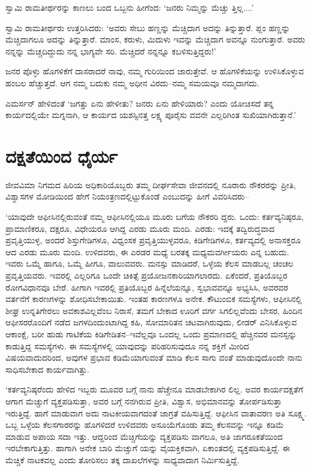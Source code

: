 ಸ್ವಾಮಿ ರಾಮತೀರ್ಥರನ್ನು ಕಾಣಲು ಬಂದ ಒಬ್ಬನು ಹೀಗೆಂದ: ‘ಜನರು ನಿಮ್ಮನ್ನು ಮೆಚ್ಚು ತ್ತಿಲ್ಲ....’

ಸ್ವಾಮಿ ರಾಮತೀರ್ಥರು ಉತ್ತರಿಸಿದರು: ‘ಅವರು ಸೇಬು ಹಣ್ಣನ್ನು ಮೆಚ್ಚಿದಾಗ ಅದನ್ನು ತಿನ್ನುತ್ತಾರೆ. ಪ್ಲಂ ಹಣ್ಣನ್ನು ಮೆಚ್ಚಿದಾಗಲೂ ಅದನ್ನು ತಿನ್ನುತ್ತಾರೆ. ಮಾಂಸ, ಕರುಳು, ಮಿದುಳು ಇವನ್ನು ಮೆಚ್ಚಿದಾಗ ಅವನ್ನೂ ನುಂಗುತ್ತಾರೆ. ಅವರು ನನ್ನನ್ನು ಮೆಚ್ಚದಿದ್ದುದು ನನ್ನ ಭಾಗ್ಯವೇ ಸರಿ. ಮೆಚ್ಚಿದರೆ ನನ್ನನ್ನೂ ಕಬಳಿಸುತ್ತಿದ್ದರು!’

ಜನರ ಪೊಳ್ಳು ಹೊಗಳಿಕೆಗೆ ದಾಸರಾದರೆ ನಾವು, ನಮ್ಮ ಗುರಿಯಿಂದ ಜಾರುತ್ತೇವೆ. ಆ ಹೊಗಳಿಕೆಯನ್ನು ಉಳಿಸಿಕೊಳ್ಳುವ ಹಂಬಲ ಹೆಚ್ಚುತ್ತದೆ. ಆಗ ನಮ್ಮ ಬದುಕು ನಮ್ಮ ಅಧೀನ ವಿರದು–ನಮ್ಮ ಸಮಯವೂ ನಮ್ಮದಾಗದು.

ಎಮರ್ಸನ್ ಹೇಳಿದಂತೆ ‘ಜಗತ್ತು ಏನು ಹೇಳೀತು? ಜನರು ಏನು ಹೇಳಿಯಾರು? ಎಂದು ಯೋಚಿಸದೆ ತನ್ನ ಕಾರ್ಯದಲ್ಲಿಯೇ ಮಗ್ನನಾಗಿ, ಆ ಕಾರ್ಯದ ಯಶಸ್ಸಿನತ್ತ ಲಕ್ಷ್ಯ ಪೂರೈಸು ವವನೇ ಎಲ್ಲರಿಗಿಂತ ಸುಖಿಯಾಗಿರುತ್ತಾನೆ.’


\section{ದಕ್ಷತೆಯಿಂದ ಧೈರ್ಯ}

ಜೀವವಿಮಾ ನಿಗಮದ ಹಿರಿಯ ಅಧಿಕಾರಿಯೊಬ್ಬರು ತಮ್ಮ ದೀರ್ಘಸೇವಾ ಜೀವನದಲ್ಲಿ ನೂರಾರು ನೌಕರರನ್ನು ಪ್ರೀತಿ, ವಿಶ್ವಾಸಗಳ ಮೋಡಿಯಿಂದ ಹೇಗೆ ನಿಯಂತ್ರಣದಲ್ಲಿಟ್ಟುಕೊಂಡೆ ಎಂಬುದನ್ನು ಹೀಗೆ ವಿವರಿಸಿದರು–

‘ಯಾವುದೇ ಆಫೀಸಿನಲ್ಲಿರುವಂತೆ ನಮ್ಮ ಆಫೀಸಿನಲ್ಲಿಯೂ ಮೂರು ಬಗೆಯ ನೌಕರರಿ ದ್ದರು. ಒಂದು: ಕರ್ತವ್ಯನಿಷ್ಠರೂ, ಪ್ರಾಮಾಣಿಕರೂ, ದಕ್ಷರೂ, ವಿಧೇಯರೂ ಆಗಿದ್ದ ಎರಡು ಮೂರು ಮಂದಿ. ಎರಡು: ಇದಕ್ಕೆ ತದ್ವಿರುದ್ಧವಾದ ಪ್ರವೃತ್ತಿಯುಳ್ಳ, ಅಂದರೆ ಶಿಸ್ತುಗೇಡಿಗಳೂ, ವಿಧ್ವಂಸಕ ಪ್ರವೃತ್ತಿಯುಳ್ಳವರೂ, ಕಿಡಿಗೇಡಿಗಳೂ, ಕರ್ತವ್ಯದಲ್ಲಿ ಅನಾಸಕ್ತರೂ ಆದ ಎರಡು ಮೂರು ಮಂದಿ. ಉಳಿದವರು, ಈ ಎರಡರ ಮಧ್ಯೆ ಬರತಕ್ಕ ಮಧ್ಯಮವರ್ಗೀಯರು ಎನ್ನ ಬಹುದು. ಇವರು ಒಮ್ಮೆ ಹಾಗೂ, ಒಮ್ಮೆ ಹೀಗೂ, ವಾಲುವವರು. ಮನಸ್ಸು ಮಾಡಿದರೆ, ಒಳ್ಳೆಯ ಕೆಲಸ ಮಾಡಬಲ್ಲ ಚಂಚಲ ಪ್ರವೃತ್ತಿಯವರು. ಇವರಲ್ಲಿ ಎಲ್ಲರಿಗೂ ಒಂದೇ ಚಿಕಿತ್ಸೆ ಪ್ರಯೋಜನಕಾರಿಯಾಗಲಾರದು. ಏಕೆಂದರೆ, ಪ್ರತಿಯೊಬ್ಬರ ರೋಗವಿಧಾನವೂ ಬೇರೆ. ಹೀಗಾಗಿ ಇವರಲ್ಲಿ ಪ್ರತಿಯೊಬ್ಬರ ಹಿನ್ನೆಲೆಯನ್ನೂ, ಸ್ವಭಾವವನ್ನೂ ಅಭ್ಯಸಿಸಿ, ಅವರವರ ವರ್ತನೆಗೆ ಕಾರಣಗಳನ್ನು ಶೋಧಿಸಬೇಕಾಯಿತು. ಇಂತಹ ಕಾರಣಗಳೂ ಅನೇಕ. ಕೌಟುಂಬಿಕ ಸಮಸ್ಯೆಗಳು, ಆಫೀಸಿನಲ್ಲಿ ಶೀಘ್ರ ಉನ್ನತಿಗೇರಲು ಅವಕಾಶವಿಲ್ಲವೆಂಬ ನಿರಾಸೆ, ತಮಗೆ ಬೇಕಾದ ಊರಿಗೆ ವರ್ಗ ಸಿಗಲಿಲ್ಲವೆಂದು ಬೇಸರ, ಹಿಂದಿನ ಆಫೀಸರರೊಂದಿಗೆ ನಡೆದ ಜಗಳದಿಂದುಂಟಾಗಿದ್ದ ಕಹಿ, ಸೋಮಾರಿತನ ಚಟವಾಗಿರುವುದು, ಲೀಡರ್ ಎನಿಸಿಕೊಳ್ಳುವ ಆಕಾಂಕ್ಷೆ, ಬರೀ ಹುಡು ಗಾಟಿಕೆಯ ಕಿಡಿಗೇಡಿತನ–ಇವೆಲ್ಲವೂ ಒಂದಲ್ಲ ಒಂದು ಪ್ರಮಾಣದಲ್ಲಿ ಹೆಚ್ಚಿನವರ ಮನಸ್ಸನ್ನು ಕಾಡುತ್ತಿದ್ದ ಸಮಸ್ಯೆಗಳು. ಈ ಸಮಸ್ಯೆಗಳಲ್ಲಿ ಯಾವುದನ್ನು ಪರಿಹರಿಸುವುದೂ ನನ್ನ ಶಕ್ತಿಗೆ ಮೀರಿದ ವಿಷಯವಾದುದರಿಂದ, ಅವುಗಳ ಪ್ರಭಾವ ಕಡಿಮೆಯಾಗುವಂತೆ ಮಾಡಿ ಕೆಲಸ ಸಾಗು ವಂತೆ ಮಾಡುವುದೊಂದೇ ನಾನು ಸಾಧಿಸಬೇಕಾದ ಕಾರ್ಯವಾಗಿತ್ತು.

‘ಕರ್ತವ್ಯನಿಷ್ಠರೆಂದು ಹೇಳಿದ ಇಬ್ಬರು ಮೂವರ ಬಗ್ಗೆ ನಾನು ಹೆಚ್ಚೇನೂ ಮಾಡಬೇಕಾಗಿರ ಲಿಲ್ಲ. ಅವರ ಕಾರ್ಯದಕ್ಷತೆಗೆ ಆಗಾಗ ಮೆಚ್ಚುಗೆ ವ್ಯಕ್ತಪಡಿಸುತ್ತಾ, ಅವರ ಬಗ್ಗೆ ನನಗಿರುವ ಪ್ರೀತಿ, ವಿಶ್ವಾಸ, ಅಭಿಮಾನವನ್ನು ತೋರ್ಪಡಿಸುತ್ತಾ ಇರುತ್ತಿದ್ದೆ. ಹಾಗೆ ಮಾಡುವಾಗ ಅದು ನಾಟಕೀಯವಾಗದಂತೆ ಜಾಗ್ರತೆ ವಹಿಸುತ್ತಿದ್ದೆ. ಆಫೀಸಿನ ವಾತಾವರಣ ಅತಿ ಸೂಕ್ಷ್ಮ. ಒಬ್ಬ ಒಳ್ಳೆಯ ಕೆಲಸಗಾರರನ್ನು ಹೊಗಳಿದರೆ ಉಳಿದವರು ಅಸೂಯೆಗೊಂಡು ತಮ್ಮ ಕೆಲಸವನ್ನು ಇನ್ನೂ ಕಡಿಮೆ ಮಾಡುವ ಅಪಾಯ ಸದಾ ಇತ್ತು. ಆದ್ದರಿಂದ ಮೆಚ್ಚಿಗೆಯನ್ನು ವ್ಯಕ್ತಪಡಿಸು ವಾಗಲೂ, ಅತಿ ಜಾಗರೂಕತೆಯಿಂದ ಇರಬೇಕಾಗುತ್ತಿತ್ತು. ಹಾಗಾಗಿ ಅನೇಕ ಬಾರಿ ಮೆಚ್ಚುಗೆ ಯನ್ನು ವೈಯಕ್ತಿಕವಾಗಿ, ಏಕಾಂತದಲ್ಲಿ ವ್ಯಕ್ತಪಡಿಸುತ್ತಿದ್ದೆ. ಈ ಮೆಚ್ಚಿಕೆ ನಾಟಕವಲ್ಲ ಎಂದು ತೋರಿಸಲು ತಕ್ಕ ದಾಖಲೆಗಳನ್ನು ಸಾಧ್ಯವಾದಾಗ ನಿರ್ಮಿಸುತ್ತಿದ್ದೆ.

